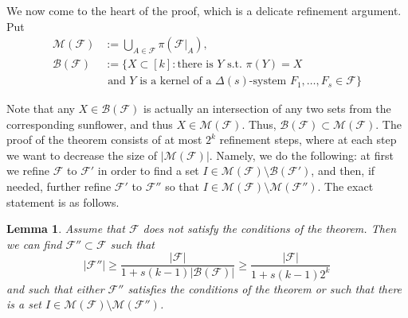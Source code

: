 \documentclass[graybox]{svmult}
\renewcommand{\ge}{\geqslant}
\newcommand{\ff}{\mathcal{F}}
\newcommand{\m}{\mathcal}
\newtheorem{lem}[thm]{Lemma}
\begin{document}
We now come to the heart of the proof, which is a delicate refinement argument.  Put \begin{align*}\m M(\ff)&:=\bigcup_{A\in \ff} \pi(\ff|_A),\\ \m B(\ff)&:=\{X\subset [k]: \text{there is $Y$ s.t. } \pi(Y) = X \\ &\text{\ \ \ \ \ \  and } Y \text{ is a kernel of a }\Delta(s)\text{-system } F_1,\ldots, F_s\in \ff\}\end{align*}

Note that any $X\in\m B(\ff)$ is actually an intersection of any two sets from the corresponding sunflower, and thus $X\in \m M(\ff)$. Thus, $\m B(\ff)\subset \m M(\ff)$. The proof of the theorem consists of at most $2^k$ refinement steps, where at each step we want to decrease the size of $|\m M(\ff)|$. Namely, we do the following:   at first we refine $\ff$ to $\ff'$ in order to find a set $I\in \m M(\ff)\setminus \m B(\ff')$, and then, if needed, further refine  $\ff'$ to $\ff''$ so that $I\in \m M(\ff)\setminus \m M(\ff'')$. The exact statement is as follows.
    \begin{lem}\label{lemfur1} Assume that $\ff$ does not satisfy the conditions of the theorem. Then we can find $\ff''\subset \ff$ such that $$|\ff''|\ge \frac{|\ff|}{1+s(k-1)|\m B(\ff)|}\ge \frac{|\ff|}{1+s(k-1)2^{k}}$$ and such that either $\ff''$ satisfies the conditions of the theorem or such that there is a set $I\in \m M(\ff)\setminus \m M(\ff'')$.\end{lem}
\end{document}
